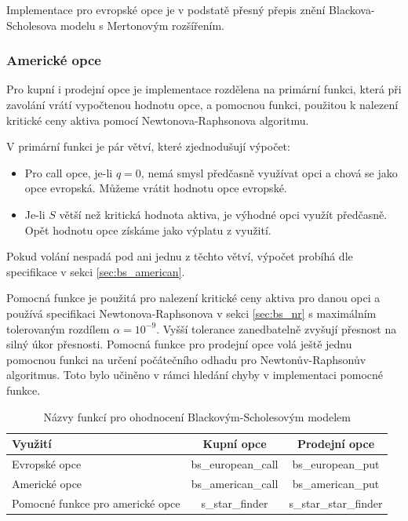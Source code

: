 \documentclass[male,czech,api_bc]{kitheses}
\begin{document}
  Implementace pro evropské opce je v podstatě přesný přepis znění Blackova-Scholesova modelu s Mertonovým rozšířením.

  \subsubsection{Americké opce}

  Pro kupní i prodejní opce je implementace rozdělena na primární funkci, která při zavolání vrátí vypočtenou hodnotu opce, a pomocnou funkci, použitou k nalezení kritické ceny aktiva pomocí Newtonova-Raphsonova algoritmu.

  V primární funkci je pár větví, které zjednodušují výpočet:
  \begin{itemize}
    \item Pro call opce, je-li $q = 0$, nemá smysl předčasně využívat opci a chová se jako opce evropská. Můžeme vrátit hodnotu opce evropské. 
    \item Je-li $S$ větší než kritická hodnota aktiva, je výhodné opci využít předčasně. Opět hodnotu opce získáme jako výplatu z využití.
  \end{itemize}

  Pokud volání nespadá pod ani jednu z těchto větví, výpočet probíhá dle specifikace v sekci \ref{sec:bs_american}.

  Pomocná funkce je použitá pro nalezení kritické ceny aktiva pro danou opci a používá specifikaci Newtonova-Raphsonova v sekci \ref{sec:bs_nr} s maximálním tolerovaným rozdílem $\alpha = 10^{-9}$. Vyšší tolerance zanedbatelně zvyšují přesnost na silný úkor přesnosti.
  Pomocná funkce pro prodejní opce volá ještě jednu pomocnou funkci na určení počátečního odhadu pro Newtonův-Raphsonův algoritmus. Toto bylo učiněno v rámci hledání chyby v implementaci pomocné funkce.

  \begin{table}[h!]
    \centering
    \label{tab:bs_function_names}
    \caption{Názvy funkcí pro ohodnocení Blackovým-Scholesovým modelem}
    \begin{tabular}{lcc}
      \toprule
      Využití & Kupní opce & Prodejní opce \\
      \midrule
      Evropské opce & bs\_european\_call & bs\_european\_put \\
      \midrule
      Americké opce & bs\_american\_call & bs\_american\_put \\
      Pomocné funkce pro americké opce & s\_star\_finder & s\_star\_star\_finder \\
      \bottomrule
    \end{tabular}
  \end{table}
\end{document}
